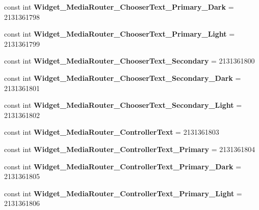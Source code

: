 \begin{DoxyCompactItemize}
const int {\bfseries Widget\+\_\+\+Media\+Router\+\_\+\+Chooser\+Text\+\_\+\+Primary\+\_\+\+Dark} = 2131361798
\item 
\mbox{\label{classXaria_1_1Resource_1_1Style_ad62a0e240e639ea8b2a01d80d4301a1c}} 
const int {\bfseries Widget\+\_\+\+Media\+Router\+\_\+\+Chooser\+Text\+\_\+\+Primary\+\_\+\+Light} = 2131361799
\item 
\mbox{\label{classXaria_1_1Resource_1_1Style_a5ddf847b16dd684c8ca26851476a2959}} 
const int {\bfseries Widget\+\_\+\+Media\+Router\+\_\+\+Chooser\+Text\+\_\+\+Secondary} = 2131361800
\item 
\mbox{\label{classXaria_1_1Resource_1_1Style_aae2de78efe34d58eadb51455fb2faefa}} 
const int {\bfseries Widget\+\_\+\+Media\+Router\+\_\+\+Chooser\+Text\+\_\+\+Secondary\+\_\+\+Dark} = 2131361801
\item 
\mbox{\label{classXaria_1_1Resource_1_1Style_ae63625ca41a81ff2eda38334d9860315}} 
const int {\bfseries Widget\+\_\+\+Media\+Router\+\_\+\+Chooser\+Text\+\_\+\+Secondary\+\_\+\+Light} = 2131361802
\item 
\mbox{\label{classXaria_1_1Resource_1_1Style_abd5f4e00cc9d93c2fa7ba97db36cf028}} 
const int {\bfseries Widget\+\_\+\+Media\+Router\+\_\+\+Controller\+Text} = 2131361803
\item 
\mbox{\label{classXaria_1_1Resource_1_1Style_a34f80dcb34202ce8eb95ea1ab3160d50}} 
const int {\bfseries Widget\+\_\+\+Media\+Router\+\_\+\+Controller\+Text\+\_\+\+Primary} = 2131361804
\item 
\mbox{\label{classXaria_1_1Resource_1_1Style_a9d6227ef3a4a96bce335acb11ca4976c}} 
const int {\bfseries Widget\+\_\+\+Media\+Router\+\_\+\+Controller\+Text\+\_\+\+Primary\+\_\+\+Dark} = 2131361805
\item 
\mbox{\label{classXaria_1_1Resource_1_1Style_aa5290fb554813d989f61cb24c33d73db}} 
const int {\bfseries Widget\+\_\+\+Media\+Router\+\_\+\+Controller\+Text\+\_\+\+Primary\+\_\+\+Light} = 2131361806

\end{DoxyCompactItemize}
